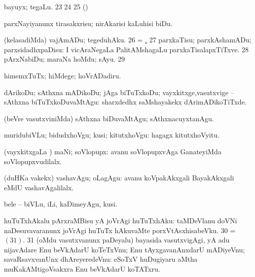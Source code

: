 { bayuyx; tegaLu. 
\num{23} 
\num{24}  
\num{25}  (\ashi)

 parxNayiyanunx tirasakxrisu; nirAkarisi kaLuhisi biDu. 

\hypertarget{give nuga25b}{}
 (kelasadiMda) vajAmADu; tegeduhAku. 
\num{26}  = \hyperlink{give nuga25b}{\nuga {}.}
\num{27}  parxkaTisu; parxkAshamADu; parxsidadhxpaDisu:
 I
vicAraNegaLa PalitAMshagaLu parxkaTisalapxTiTxve. 
\num{28}  pArxNabiDu; maraNa hoMdu; sAyu. 
\num{29}  

 himemxTuTx; hiMdege; hoVrADadiru. 

 dArikoDu; sAthxna mADikoDu; jAga biTuTxkoDu;
vayxkitxge,vasutxvige -- sAthxna biTuTxkoDuvaMtAgu:  sharxdedhx saMshayakekx dArimADikoTiTxde. 

 (beVre vasutxviniMda) sAthxna
biDuvaMtAgu; sAthxnacuyxtanAgu. 

 muridubiVLu; bidudxhoVgu; kusi;
kitutxhoVgu:  hagagx kitutxhoVyitu. 

 (vayxkitxgaLa \vi) maNi; soVlopupx:  avanu soVlopupxvAga GanateyiMda soVlopupxvudilalx. 

 (duHKa \mo vakekx) vashavAgu; oLagAgu:  avanu koVpakAkxgali BayakAkxgali eMdU vashavAgalilalx. 

 bele -- biVLu, iLi, kaDimeyAgu, kusi. 

 huTuTxhAkalu pArxraMBisu yA joVrAgi huTuTxhAku:  taMDeVlanu doVNi
naDesuvavaranunx joVrAgi huTuTx hAkuvaMte porxVtAsxhisabeVku.
\num{30}  = \hyperlink{give nuga31}{\nuga $(31)$}.
\hypertarget{give nuga31}{}
\num{31}  (oMdu vasutxvanunx paDeyalu)
bayasida vasutxvigAgi, yA adu nijavAdare Enu beVkAdarU koTeTxVnu; Enu
tAyxgavanAnxdarU mADiyeVnu; savaRsavxvanUnx dhAreyeredeVnu:  eSoTxV
huDugiyaru aMtha muKakAMtigoVsakxra Enu beVkAdarU koTATxru.}
\eentry

\bentry
{}
\gl{\nA}
\eentry

